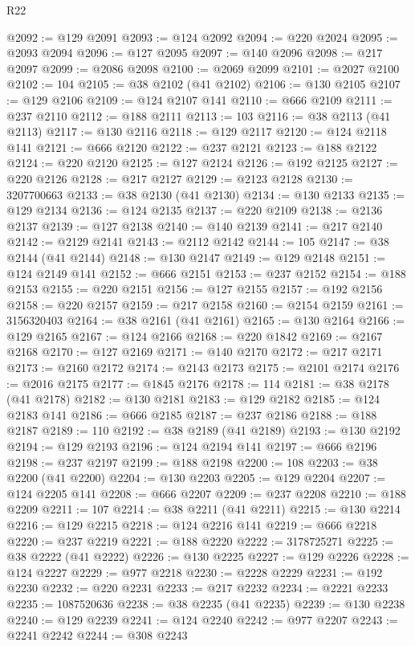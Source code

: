 \begin{lexlean}{R22}
\begin{coremodule}
@2092 := @129 @2091
@2093 := @124 @2092
@2094 := @220 @2024
@2095 := @2093 @2094
@2096 := @127 @2095
@2097 := @140 @2096
@2098 := @217 @2097
@2099 := @2086 @2098
@2100 := @2069 @2099
@2101 := @2027 @2100
@2102 := 104
@2105 := @38 @2102 (@41 @2102)
@2106 := @130 @2105
@2107 := @129 @2106
@2109 := @124 @2107 @141
@2110 := @666 @2109
@2111 := @237 @2110
@2112 := @188 @2111
@2113 := 103
@2116 := @38 @2113 (@41 @2113)
@2117 := @130 @2116
@2118 := @129 @2117
@2120 := @124 @2118 @141
@2121 := @666 @2120
@2122 := @237 @2121
@2123 := @188 @2122
@2124 := @220 @2120
@2125 := @127 @2124
@2126 := @192 @2125
@2127 := @220 @2126
@2128 := @217 @2127
@2129 := @2123 @2128
@2130 := 3207700663
@2133 := @38 @2130 (@41 @2130)
@2134 := @130 @2133
@2135 := @129 @2134
@2136 := @124 @2135
@2137 := @220 @2109
@2138 := @2136 @2137
@2139 := @127 @2138
@2140 := @140 @2139
@2141 := @217 @2140
@2142 := @2129 @2141
@2143 := @2112 @2142
@2144 := 105
@2147 := @38 @2144 (@41 @2144)
@2148 := @130 @2147
@2149 := @129 @2148
@2151 := @124 @2149 @141
@2152 := @666 @2151
@2153 := @237 @2152
@2154 := @188 @2153
@2155 := @220 @2151
@2156 := @127 @2155
@2157 := @192 @2156
@2158 := @220 @2157
@2159 := @217 @2158
@2160 := @2154 @2159
@2161 := 3156320403
@2164 := @38 @2161 (@41 @2161)
@2165 := @130 @2164
@2166 := @129 @2165
@2167 := @124 @2166
@2168 := @220 @1842
@2169 := @2167 @2168
@2170 := @127 @2169
@2171 := @140 @2170
@2172 := @217 @2171
@2173 := @2160 @2172
@2174 := @2143 @2173
@2175 := @2101 @2174
@2176 := @2016 @2175
@2177 := @1845 @2176
@2178 := 114
@2181 := @38 @2178 (@41 @2178)
@2182 := @130 @2181
@2183 := @129 @2182
@2185 := @124 @2183 @141
@2186 := @666 @2185
@2187 := @237 @2186
@2188 := @188 @2187
@2189 := 110
@2192 := @38 @2189 (@41 @2189)
@2193 := @130 @2192
@2194 := @129 @2193
@2196 := @124 @2194 @141
@2197 := @666 @2196
@2198 := @237 @2197
@2199 := @188 @2198
@2200 := 108
@2203 := @38 @2200 (@41 @2200)
@2204 := @130 @2203
@2205 := @129 @2204
@2207 := @124 @2205 @141
@2208 := @666 @2207
@2209 := @237 @2208
@2210 := @188 @2209
@2211 := 107
@2214 := @38 @2211 (@41 @2211)
@2215 := @130 @2214
@2216 := @129 @2215
@2218 := @124 @2216 @141
@2219 := @666 @2218
@2220 := @237 @2219
@2221 := @188 @2220
@2222 := 3178725271
@2225 := @38 @2222 (@41 @2222)
@2226 := @130 @2225
@2227 := @129 @2226
@2228 := @124 @2227
@2229 := @977 @2218
@2230 := @2228 @2229
@2231 := @192 @2230
@2232 := @220 @2231
@2233 := @217 @2232
@2234 := @2221 @2233
@2235 := 1087520636
@2238 := @38 @2235 (@41 @2235)
@2239 := @130 @2238
@2240 := @129 @2239
@2241 := @124 @2240
@2242 := @977 @2207
@2243 := @2241 @2242
@2244 := @308 @2243

\end{coremodule}
\end{lexlean}
